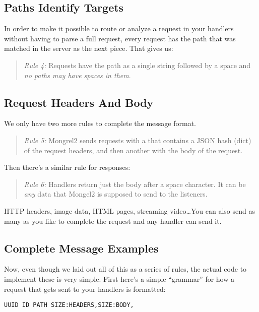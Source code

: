 \subsection{Paths Identify Targets}

In order to make it possible to route or analyze a request in your handlers
without having to parse a full request, every request has the path that
was matched in the server as the next piece.  That gives us:

\begin{quote}
\emph{Rule 4:} Requests have the path as a single string followed by a
    space and \emph{no paths may have spaces in them}.
\end{quote}


\subsection{Request Headers And Body}

We only have two more rules to complete the message format.

\begin{quote}
\emph{Rule 5:} Mongrel2 sends requests with a  that contains a
JSON hash (dict) of the request headers, and then another 
with the body of the request.
\end{quote}

Then there's a similar rule for responses:

\begin{quote}
\emph{Rule 6:} Handlers return just the body after a space character.  It can be \emph{any}
    data that Mongel2 is supposed to send to the listeners.
\end{quote}

HTTP headers, image data, HTML pages, streaming video\ldots You can also send as
many as you like to complete the request and any handler can send it.


\subsection{Complete Message Examples}

Now, even though we laid out all of this as a series of rules, the actual code to implement
these is very simple.  First here's a simple ``grammar'' for how a request that
gets sent to your handlers is formatted:

\begin{lstlisting}
UUID ID PATH SIZE:HEADERS,SIZE:BODY,
\end{lstlisting}

